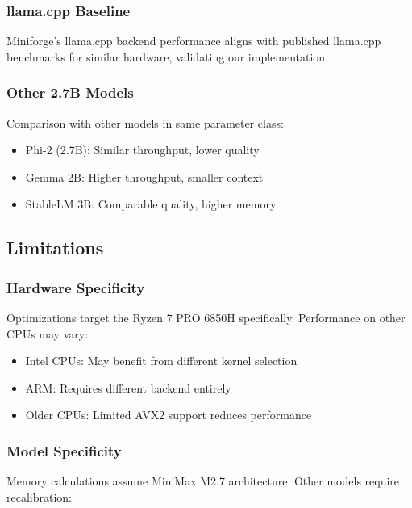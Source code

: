\subsubsection{llama.cpp Baseline}

Miniforge's llama.cpp backend performance aligns with published llama.cpp benchmarks for similar hardware, validating our implementation.

\subsubsection{Other 2.7B Models}

Comparison with other models in same parameter class:

\begin{itemize}
    \item Phi-2 (2.7B): Similar throughput, lower quality
    \item Gemma 2B: Higher throughput, smaller context
    \item StableLM 3B: Comparable quality, higher memory
\end{itemize}

\subsection{Limitations}

\subsubsection{Hardware Specificity}

Optimizations target the Ryzen 7 PRO 6850H specifically. Performance on other CPUs may vary:

\begin{itemize}
    \item Intel CPUs: May benefit from different kernel selection
    \item ARM: Requires different backend entirely
    \item Older CPUs: Limited AVX2 support reduces performance
\end{itemize}

\subsubsection{Model Specificity}

Memory calculations assume MiniMax M2.7 architecture. Other models require recalibration:


